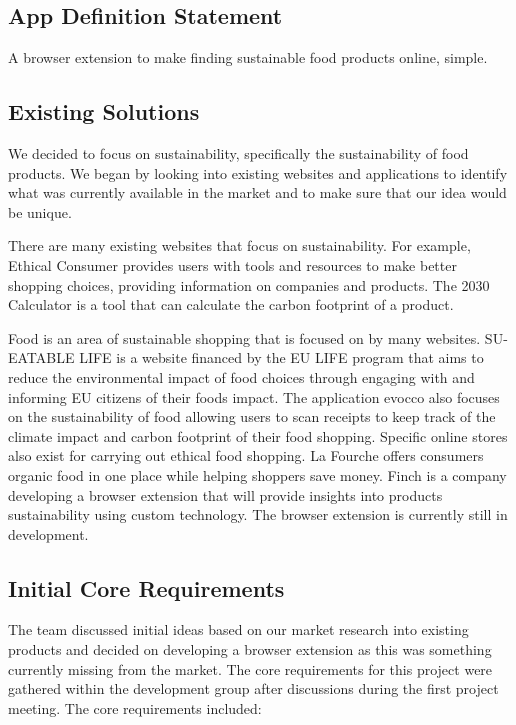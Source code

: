 \documentclass[a4,10pt,twocolumn]{article}
\begin{document}
\subsection*{App Definition Statement}

A browser extension to make finding sustainable food products online, simple. 

\subsection*{Existing Solutions}
We decided to focus on sustainability, specifically the sustainability of food products. We began by looking into existing websites and applications to identify what was currently available in the market and to make sure that our idea would be unique.

There are many existing websites that focus on sustainability. For example, Ethical Consumer \cite{EthicalConsumer} provides users with tools and resources to make better shopping choices, providing information on companies and products. The 2030 Calculator \cite{2030} is a tool that can calculate the carbon footprint of a product.

Food is an area of sustainable shopping that is focused on by many websites. SU-EATABLE LIFE \cite{SU-EATABLE} is a website financed by the EU LIFE program that aims to reduce the environmental impact of food choices through engaging with and informing EU citizens of their foods impact. The application evocco \cite{evocco} also focuses on the sustainability of food allowing users to scan receipts to keep track of the climate impact and carbon footprint of their food shopping. Specific online stores also exist for carrying out ethical food shopping. La Fourche \cite{LaFourche} offers consumers organic food in one place while helping shoppers save money. Finch \cite{Finch} is a company developing a browser extension that will provide insights into products sustainability using custom technology. The browser extension is currently still in development. 

\subsection*{Initial Core Requirements}
The team discussed initial ideas based on our market research into existing products and decided on developing a browser extension as this was something currently missing from the market. The core requirements for this project were gathered within the development group after discussions during the first project meeting. The core requirements included:
\end{document}
